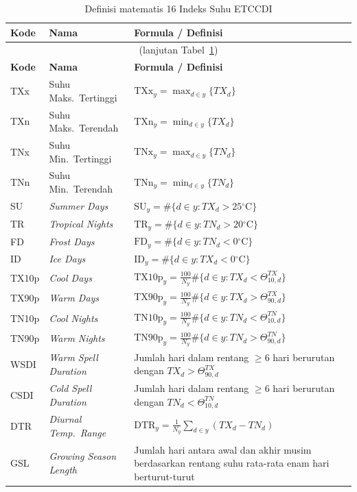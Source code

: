 \documentclass[12pt, a4paper]{article}
\newcommand{\degC}{$^{\circ}$C}
\begin{document}
\begin{longtable}[l]{@{}p{1.4cm}p{4.5cm}p{7.5cm}@{}}
  \caption{Definisi matematis 16 Indeks Suhu ETCCDI}\label{tab:def_temp}\\
  \toprule
  \textbf{Kode} & \textbf{Nama} & \textbf{Formula / Definisi} \\
  \midrule
  \endfirsthead
  \multicolumn{3}{c}{\footnotesize(lanjutan Tabel~\ref{tab:def_temp})}\\
  \toprule
  \textbf{Kode} & \textbf{Nama} & \textbf{Formula / Definisi} \\
  \midrule
  \endhead
  \bottomrule
  \endfoot
  TXx  & Suhu Maks.\ Tertinggi & $\text{TXx}_y = \max_{d \in y}\{TX_d\}$ \\[3pt]
  TXn  & Suhu Maks.\ Terendah  & $\text{TXn}_y = \min_{d \in y}\{TX_d\}$ \\[3pt]
  TNx  & Suhu Min.\ Tertinggi  & $\text{TNx}_y = \max_{d \in y}\{TN_d\}$ \\[3pt]
  TNn  & Suhu Min.\ Terendah   & $\text{TNn}_y = \min_{d \in y}\{TN_d\}$ \\[3pt]
  SU   & \textit{Summer Days}  & $\text{SU}_y = \#\{d \in y : TX_d > 25\text{\degC}\}$ \\[3pt]
  TR   & \textit{Tropical Nights} & $\text{TR}_y = \#\{d \in y : TN_d > 20\text{\degC}\}$ \\[3pt]
  FD   & \textit{Frost Days}   & $\text{FD}_y = \#\{d \in y : TN_d < 0\text{\degC}\}$ \\[3pt]
  ID   & \textit{Ice Days}     & $\text{ID}_y = \#\{d \in y : TX_d < 0\text{\degC}\}$ \\[3pt]
  TX10p & \textit{Cool Days}   & $\text{TX10p}_y = \frac{100}{N_y}\#\{d \in y : TX_d < \Theta^{TX}_{10,d}\}$ \\[3pt]
  TX90p & \textit{Warm Days}   & $\text{TX90p}_y = \frac{100}{N_y}\#\{d \in y : TX_d > \Theta^{TX}_{90,d}\}$ \\[3pt]
  TN10p & \textit{Cool Nights} & $\text{TN10p}_y = \frac{100}{N_y}\#\{d \in y : TN_d < \Theta^{TN}_{10,d}\}$ \\[3pt]
  TN90p & \textit{Warm Nights} & $\text{TN90p}_y = \frac{100}{N_y}\#\{d \in y : TN_d > \Theta^{TN}_{90,d}\}$ \\[3pt]
  WSDI & \textit{Warm Spell Duration} & Jumlah hari dalam rentang $\geq 6$ hari berurutan dengan $TX_d > \Theta^{TX}_{90,d}$ \\[3pt]
  CSDI & \textit{Cold Spell Duration}  & Jumlah hari dalam rentang $\geq 6$ hari berurutan dengan $TN_d < \Theta^{TN}_{10,d}$ \\[3pt]
  DTR  & \textit{Diurnal Temp.\ Range} & $\text{DTR}_y = \frac{1}{N_y}\sum_{d \in y}(TX_d - TN_d)$ \\[3pt]
  GSL  & \textit{Growing Season Length} & Jumlah hari antara awal dan akhir musim berdasarkan rentang suhu rata-rata enam hari berturut-turut \\
\end{longtable}
\end{document}
